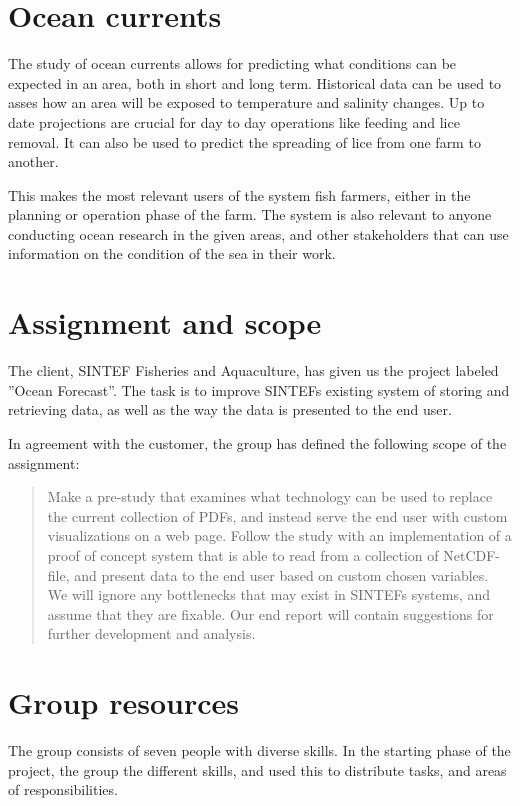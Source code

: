 \documentclass[11pt,a4paper,titlepage,oneside]{report}
\begin{document}
\section{Ocean currents}
The study of ocean currents allows for predicting what conditions can be expected in an area, both in short and long term. Historical data can be used to asses how an area will be exposed to temperature and salinity changes. Up to date projections are crucial for day to day operations like feeding and lice removal. It can also be used to predict the spreading of lice from one farm to another.

This makes the most relevant users of the system fish farmers, either in the planning or operation phase of the farm. The system is also relevant to anyone conducting ocean research in the given areas, and other stakeholders that can use information on the condition of the sea in their work.

\section{Assignment and scope}
The client, SINTEF Fisheries and Aquaculture, has given us the project labeled ”Ocean Forecast”. The task is to improve SINTEFs existing system of storing and retrieving data, as well as the way the data is presented to the end user. 

In agreement with the customer, the group has defined the following scope of the assignment:

\begin{quote}
Make a pre-study that examines what technology can be used to replace the current collection of PDFs, and instead serve the end user with custom visualizations on a web page. Follow the study with an implementation of a proof of concept system that is able to read from a collection of NetCDF-file, and present data to the end user based on custom chosen variables. We will ignore any bottlenecks that may exist in SINTEFs systems, and assume that they are fixable. Our end report will contain suggestions for further development and analysis.
\end{quote}

\section{Group resources}
The group consists of seven people with diverse skills. In the starting phase of the project, the group the different skills, and used this to distribute tasks, and areas of responsibilities. 
\end{document}

